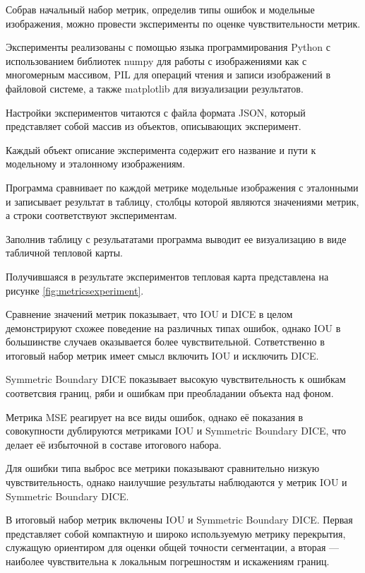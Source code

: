Собрав начальный набор метрик, определив типы ошибок и модельные изображения, можно провести эксперименты по оценке чувствительности метрик.

Эксперименты реализованы с помощью языка программирования Python с использованием библиотек numpy для работы с изображениями как с многомерным массивом, PIL для операций чтения и записи изображений в файловой системе, а также matplotlib для визуализации результатов.

Настройки экспериментов читаются с файла формата JSON, который представляет собой массив из объектов, описывающих эксперимент. 

Каждый объект описание эксперимента содержит его название и пути к модельному и эталонному изображениям.

Программа сравнивает по каждой метрике модельные изображения с эталонными и записывает результат в таблицу, столбцы которой являются значениями метрик, а строки соответствуют экспериментам.

Заполнив таблицу с резульататами программа выводит ее визуализацию в виде табличной тепловой карты.

Получившаяся в результате экспериментов тепловая карта представлена на рисунке \ref{fig:metricsexperiment}.


Сравнение значений метрик показывает, что IOU и DICE в целом демонстрируют схожее поведение на различных типах ошибок, однако IOU в большинстве случаев оказывается более чувствительной. Сответственно в итоговый набор метрик имеет смысл включить IOU и исключить DICE.

Symmetric Boundary DICE показывает высокую чувствительность к ошибкам соответсвия границ, ряби и ошибкам при преобладании объекта над фоном. 

Метрика MSE реагирует на все виды ошибок, однако её показания в совокупности дублируются метриками IOU и Symmetric Boundary DICE, что делает её избыточной в составе итогового набора.

Для ошибки типа выброс все метрики показывают сравнительно низкую чувствительность, однако наилучшие результаты наблюдаются у метрик IOU и Symmetric Boundary DICE.

В итоговый набор метрик включены IOU и Symmetric Boundary DICE. Первая представляет собой компактную и широко используемую метрику перекрытия, служащую ориентиром для оценки общей точности сегментации, а вторая — наиболее чувствительна к локальным погрешностям и искажениям границ.

